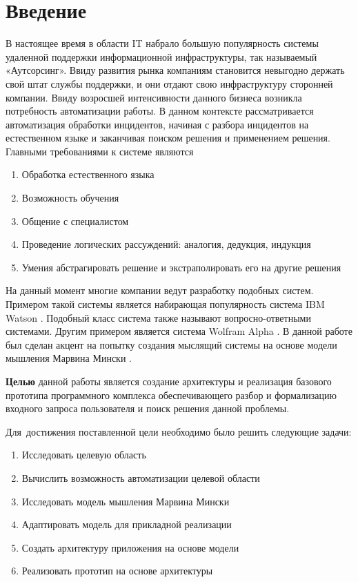 \chapter*{Введение}							%
В настоящее время в области IT набрало большую популярность системы удаленной поддержки информационной инфраструктуры, так называемый «Аутсорсинг». Ввиду развития рынка компаниям становится невыгодно держать свой штат службы поддержки, и они отдают свою инфраструктуру сторонней компании.
Ввиду возросшей интенсивности данного бизнеса возникла потребность автоматизации работы. В данном контексте рассматривается автоматизация обработки инцидентов, начиная с разбора инцидентов на естественном языке и заканчивая поиском решения и применением решения.
Главными требованиями к системе являются
\begin{enumerate}
  \item Обработка естественного языка
  \item Возможность обучения
  \item Общение с специалистом
  \item Проведение логических рассуждений: аналогия, дедукция, индукция
  \item Умения абстрагировать решение и экстраполировать его на другие решения
\end{enumerate}
На данный момент многие компании ведут разработку подобных систем. Примером такой системы является набирающая популярность система IBM Watson \cite{Watson}. Подобный класс система также называют вопросно-ответными системами. Другим примером является система Wolfram Alpha \cite{WolframAplha}.
В данной работе был сделан акцент на попытку создания мыслящий системы на основе модели мышления Марвина Мински \cite{EmotionMachine}.

\textbf{Целью} данной работы является создание архитектуры и реализация базового прототипа программного комплекса обеспечивающего разбор и формализацию входного запроса пользователя и поиск решения данной проблемы.

Для~достижения поставленной цели необходимо было решить следующие задачи:
\begin{enumerate}
  \item Исследовать целевую область
  \item Вычислить возможность автоматизации целевой области
  \item Исследовать модель мышления Марвина Мински
  \item Адаптировать модель для прикладной реализации
  \item Создать архитектуру приложения на основе модели
  \item Реализовать прототип на основе архитектуры
\end{enumerate}

